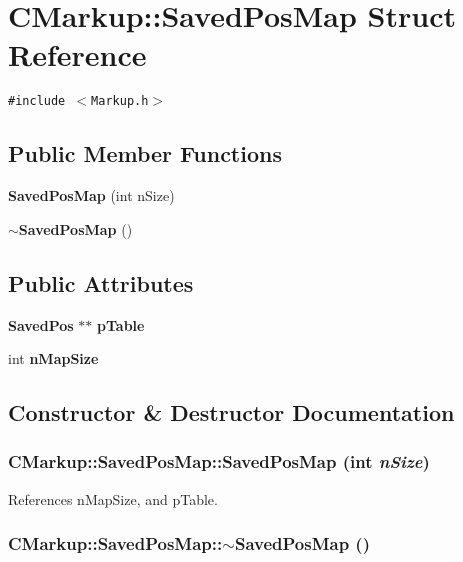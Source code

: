 \section{CMarkup::SavedPosMap Struct Reference}
\label{structCMarkup_1_1SavedPosMap}
{\tt \#include $<$Markup.h$>$}

\subsection*{Public Member Functions}
\begin{CompactItemize}
\item 
{\bf SavedPosMap} (int nSize)
\item 
{\bf $\sim$SavedPosMap} ()
\end{CompactItemize}
\subsection*{Public Attributes}
\begin{CompactItemize}
\item 
{\bf SavedPos} $\ast$$\ast$ {\bf pTable}
\item 
int {\bf nMapSize}
\end{CompactItemize}


\subsection{Constructor \& Destructor Documentation}
\subsubsection[SavedPosMap]{\setlength{\rightskip}{0pt plus 5cm}CMarkup::SavedPosMap::SavedPosMap (int {\em nSize})\hspace{0.3cm}{\tt  [inline]}}\label{structCMarkup_1_1SavedPosMap_681e409f964bbd86a088358dffaeb808}




References nMapSize, and pTable.
\subsubsection[$\sim$SavedPosMap]{\setlength{\rightskip}{0pt plus 5cm}CMarkup::SavedPosMap::$\sim$SavedPosMap ()\hspace{0.3cm}{\tt  [inline]}}\label{structCMarkup_1_1SavedPosMap_b3a7ef305893ba4b6752dea003997c96}




